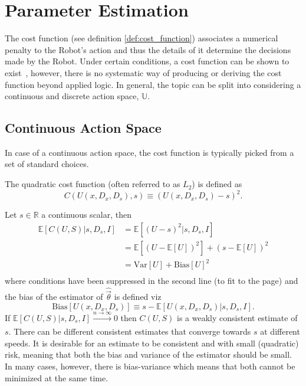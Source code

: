 \chapter{Parameter Estimation}



The cost function (see definition \ref{def:cost_function}) associates a numerical penalty to the Robot's action and thus the details of it determine the decisions made by the Robot. Under certain conditions, a cost function can be shown to exist~\citep{lavalle2006planning}, however, there is no systematic way of producing or deriving the cost function beyond applied logic. In general, the topic can be split into considering a continuous and discrete action space, $\mathbb{U}$. 	

\section{Continuous Action Space}
In case of a continuous action space, the cost function is typically picked from a set of standard choices.	

\begin{definition}
	\label{def:quadratic_cost}
	The quadratic cost function (often referred to as $L_2$) is defined as
	\begin{equation}
		C(U(x,D_x,D_s),s) \equiv (U(x,D_x,D_s)-s)^2.
	\end{equation}
\end{definition}

\begin{theorem}
	\label{theorem:MSE}
	Let $s\in \mathbb{R}$ a continuous scalar, then 
	\begin{equation}
		\begin{split}
			\mathbb{E}[C(U, S)|s,D_s,I] &= \mathbb{E}[(U-s)^2|s,D_s,I]\\ 
			&= \mathbb{E}[(U-\mathbb{E}[U])^2]+(s-\mathbb{E}[U])^2\\
			&=\text{Var}[U]+\text{Bias}[U]^2\\
		\end{split}
		\label{eq:MSE}
	\end{equation}
	where conditions have been suppressed in the second line (to fit to the page) and the bias of the estimator of $\hat{\vec{\theta}}$ is defined viz
	\begin{equation}
		\text{Bias}[U(x,D_x,D_s)]\equiv s-\mathbb{E}[U(x,D_x,D_s)|s,D_s,I].
	\end{equation}
	If $\mathbb{E}[C(U, S)|s,D_s,I]\xrightarrow[]{n\rightarrow\infty} 0$ then $C(U, S)$ is a weakly consistent estimate of $s$. There can be different consistent estimates that converge towards $s$ at different speeds. It is desirable for an estimate to be consistent and with small (quadratic) risk, meaning that both the bias and variance of the estimator should be small. In many cases, however, there is bias-variance which means that both cannot be minimized at the same time. 
\end{theorem}

